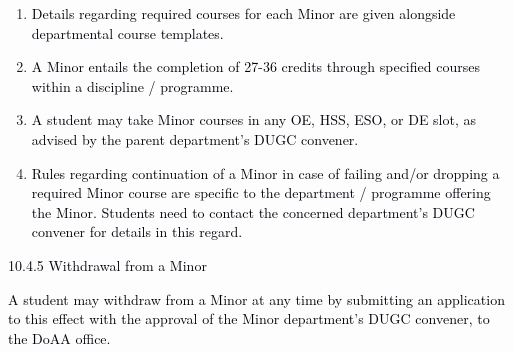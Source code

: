 \documentclass[12pt]{article}
\begin{document}
\vspace{\baselineskip}
\begin{enumerate}
	\item {\fontsize{10pt}{12.0pt}\selectfont \textcolor[HTML]{00000A}{Details regarding required courses for each Minor are given alongside departmental course templates.}\par}\par


\vspace{\baselineskip}
	\item {\fontsize{10pt}{12.0pt}\selectfont \textcolor[HTML]{00000A}{A Minor entails the completion of 27-36 credits through specified courses within a discipline / programme.}\par}\par


\vspace{\baselineskip}
	\item {\fontsize{10pt}{12.0pt}\selectfont \textcolor[HTML]{00000A}{A student may take Minor courses in any OE, HSS, ESO, or DE slot, as advised by the parent department's DUGC convener.}\par}\par


\vspace{\baselineskip}
	\item {\fontsize{10pt}{12.0pt}\selectfont \textcolor[HTML]{00000A}{Rules regarding continuation of a Minor in case of failing and/or dropping a required Minor course are specific to the department / programme offering the Minor. Students need to contact the concerned department's DUGC convener for details in this regard.}\par}
\end{enumerate}\par


\vspace{\baselineskip}
{\fontsize{10pt}{12.0pt}\selectfont \textcolor[HTML]{00000A}{10.4.5 Withdrawal from a Minor}\par}\par


\vspace{\baselineskip}
\begin{adjustwidth}{0.0in}{0.11in}
{\fontsize{10pt}{12.0pt}\selectfont \textcolor[HTML]{00000A}{A student may withdraw from a Minor at any time by submitting an application to this effect with the approval of the Minor department's DUGC convener, to the DoAA office.}\par}\par

\end{adjustwidth}
\end{document}
